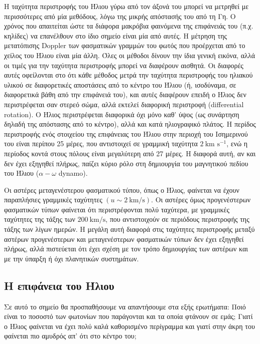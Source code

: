 Η ταχύτητα περιστροφής του Ήλιου γύρω από τον άξονά του μπορεί να μετρηθεί με περισσότερες από μία μεθόδους, λόγω της μικρής απόστασής του από τη Γη. Ο χρόνος που απαιτείται ώστε τα διάφορα μακρόβια φαινόμενα της επιφάνειάς του (π.χ. κηλίδες) να επανέλθουν στο ίδιο σημείο είναι μία από αυτές. Η μέτρηση της μετατόπισης Doppler των φασματικών γραμμών του φωτός που προέρχεται από το χείλος του Ήλιου είναι μία άλλη. Όλες οι μέθοδοι δίνουν την ίδια γενική εικόνα, αλλά οι τιμές για την ταχύτητα περιστροφής μπορεί να διαφέρουν αισθητά. Οι διαφορές αυτές οφείλονται στο ότι κάθε μέθοδος μετρά την ταχύτητα περιστροφής του ηλιακού υλικού σε διαφορετικές αποστάσεις από το κέντρο του Ήλιου (ή, ισοδύναμα, σε διαφορετικά βάθη από την επιφάνειά του), και αυτές διαφέρουν επειδή ο Ήλιος δεν περιστρέφεται σαν στερεό σώμα, αλλά εκτελεί διαφορική περιστροφή (differential rotation). Ο Ήλιος περιστρέφεται διαφορικά όχι μόνο καθ' ύψος (ως συνάρτηση δηλαδή της απόστασης από το κέντρο), αλλά και κατά ηλιογραφικό πλάτος. Η περίδος περιστροφής ενός στοιχείου της επιφάνειας του Ήλιου στην περιοχή του Ισημερινού του είναι περίπου 25 μέρες, που αντιστοιχεί σε γραμμική ταχύτητα $2 \ \text{km s$^{-1}$}$, ενώ η περίοδος κοντά στους πόλους είναι μεγαλύτερη από 27 μέρες. Η διαφορά αυτή, αν και δεν έχει εξηγηθεί πλήρως, παίζει κύριο ρόλο στη δημιουργία του μαγνητικού πεδίου του Ήλιου ($\alpha - \omega $ dynamo).

Οι αστέρες μεταγενέστερου φασματικού τύπου, όπως ο Ήλιος, φαίνεται να έχουν παραπλήσιες γραμμικές ταχύτητες $(u \sim 2 \ \text{km/s})$. Οι αστέρες όμως προγενέστερων φασματικών τύπων φαίνεται ότι περιστρέφονται πολύ ταχύτερα, με γραμμικές ταχύτητες της τάξης των $200 \ \text{km/s}$, που αντιστοιχούν σε περιόδους περιστροφής της τάξης των λίγων ημερών. Η μεγάλη αυτή διαφορά στις ταχύτητες περιστροφής μεταξύ αστέρων προγενέστερων και μεταγενέστερων φασματικών τύπων δεν έχει εξηγηθεί πλήρως, αλλά πιστεύεται ότι έχει σχέση με τον τρόπο δημιουργίας των αστέρων και με την ύπαρξη ή όχι πλανητικών συστημάτων.



\subsection{Η επιφάνεια του Ήλιου}
Σε αυτό το σημείο θα προσπαθήσουμε να απαντήσουμε στα εξής ερωτήματα: Ποιό είναι το ποσοστό των φωτονίων που παράγονται και τα οποία φτάνουν σε εμάς; Γιατί ο Ήλιος φαίνεται να έχει πολύ καλά καθορισμένο περίγραμμα και γιατί στην άκρη του φαίνεται πιο αμυδρός απ' ότι στο κέντρο του;

